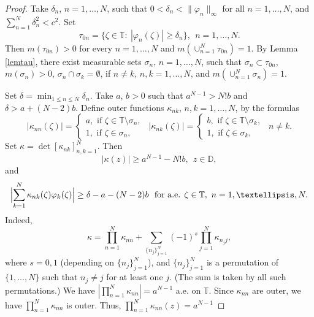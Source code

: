 \documentclass[a4paper,oneside,11pt]{amsart}
\numberwithin{equation}{section}
\theoremstyle{plain}
\theoremstyle{definition}
\begin{document}
\begin{proof}  Take $\delta_n$, $n=1,\ldots, N$, such that 
 $0<\delta_n<\|\varphi_n\|_\infty$ for all $n=1,\ldots, N$, and  $\sum_{n=1}^N\delta_n^2<c^2$. Set 
\begin{equation*}\tau_{0n}=\{\zeta\in\mathbb T:\ |\varphi_n(\zeta)|\geq \delta_n\}, \ \ n=1,\ldots, N.
\end{equation*}  
Then $m(\tau_{0n})>0$ for every $n=1,\ldots, N$ and $m(\cup_{n=1}^N\tau_{0n})=1$. By Lemma \ref{lemtau},  there exist measurable sets 
$\sigma_n$, $n=1,\ldots, N$, such that $\sigma_n\subset\tau_{0n}$, $m(\sigma_n)>0$, $\sigma_n\cap\sigma_k=\emptyset$, if $n\neq k$, 
$n,k=1, \ldots, N$, and  $m(\cup_{n=1}^N\sigma_n)=1$. 

Set $\delta=\min_{1\leq n\leq N}\delta_n$. Take $a$, $b>0$ such that $a^{N-1}>N!b$ and $\delta>a+(N-2)b$.
 Define outer functions $\kappa_{nk}$, $n,k=1, \ldots, N$, by the formulas
\begin{equation*} |\kappa_{nn}(\zeta)|=
\begin{cases} a, \text{ if }\zeta\in\mathbb T\setminus\sigma_n,\\ 1, \text{ if }\zeta\in\sigma_n,\end{cases} \ \  
|\kappa_{nk}(\zeta)|=
\begin{cases} b, \text{ if }\zeta\in\mathbb T\setminus\sigma_k,\\ 1, \text{ if }\zeta\in\sigma_k,\end{cases} \ \ n\neq k.
\end{equation*} 
Set $\kappa=\det[\kappa_{nk}]_{n,k=1}^N$. Then 
\begin{equation}\label{kappa}
|\kappa(z)|\geq a^{N-1}-N!b, \ \ z\in\mathbb D,
\end{equation} and 
\begin{equation}\label{kappaphi} \Bigl|\sum_{k=1}^N\kappa_{nk}(\zeta)\varphi_k(\zeta)\Bigr|\geq\delta-a-(N-2)b \  
\text{ for a.e. }\zeta\in\mathbb T,\  n=1,\ldots,N.
\end{equation} 
Indeed, 
\begin{equation*}
\kappa=\prod_{n=1}^N\kappa_{nn}+\sum_{\{n_j\}_{j=1}^N}(-1)^s\prod_{j=1}^N\kappa_{n_j j}, 
\end{equation*}
where $s=0,1$ (depending on  $\{n_j\}_{j=1}^N$), and $\{n_j\}_{j=1}^N$ is a permutation of $\{1,\ldots, N\}$ such that $n_j\neq j$ for at least one $j$.  (The sum is taken by all such permutations.)
We have
$|\prod_{n=1}^N\kappa_{nn}|=a^{N-1}$ a.e. on $\mathbb T$.   
Since $\kappa_{nn}$ are outer, we have $\prod_{n=1}^N\kappa_{nn}$ is outer. Thus, $\prod_{n=1}^N\kappa_{nn}(z)=a^{N-1}$ 

\end{proof}
\end{document}
